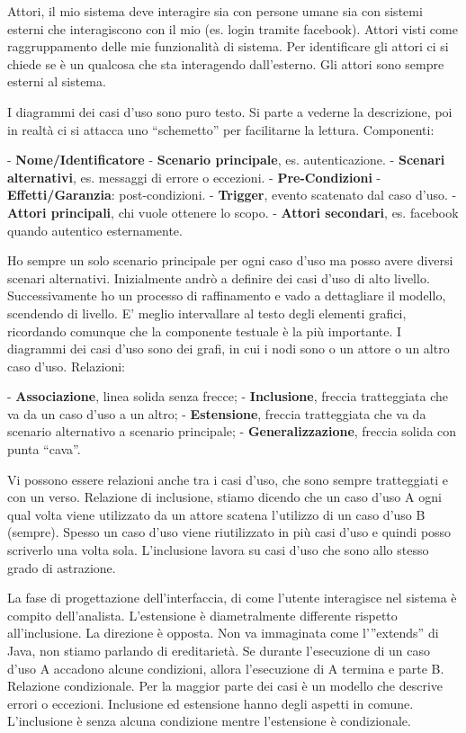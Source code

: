Attori, il mio sistema deve interagire sia con persone umane sia con sistemi esterni che interagiscono con il mio (es. login tramite facebook). Attori visti come raggruppamento delle mie funzionalità di sistema. Per identificare gli attori ci si chiede se è un qualcosa che sta interagendo dall'esterno. Gli attori sono sempre esterni al sistema.

I diagrammi dei casi d'uso sono puro testo. Si parte a vederne la descrizione, poi in realtà ci si attacca uno “schemetto” per facilitarne la lettura. Componenti:

- \textbf{Nome/Identificatore}
- \textbf{Scenario principale}, es. autenticazione.
- \textbf{Scenari alternativi}, es. messaggi di errore o eccezioni.
- \textbf{Pre-Condizioni}
- \textbf{Effetti/Garanzia}: post-condizioni.
- \textbf{Trigger}, evento scatenato dal caso d'uso.
- \textbf{Attori principali}, chi vuole ottenere lo scopo.
- \textbf{Attori secondari}, es. facebook quando autentico esternamente.

Ho sempre un solo scenario principale per ogni caso d'uso ma posso avere diversi scenari alternativi. Inizialmente andrò a definire dei casi d'uso di alto livello. Successivamente ho un processo di raffinamento e vado a dettagliare il modello, scendendo di livello. E' meglio intervallare al testo degli elementi grafici, ricordando comunque che la componente testuale è la più importante. I diagrammi dei casi d'uso sono dei grafi, in cui i nodi sono o un attore o un altro caso d'uso.
Relazioni:

- \textbf{Associazione}, linea solida senza frecce;
- \textbf{Inclusione}, freccia tratteggiata che va da un caso d'uso a un altro;
- \textbf{Estensione}, freccia tratteggiata che va da scenario alternativo a scenario principale;
- \textbf{Generalizzazione}, freccia solida con punta “cava”.

Vi possono essere relazioni anche tra i casi d'uso, che sono sempre tratteggiati e con un verso. Relazione di inclusione, stiamo dicendo che un caso d'uso A ogni qual volta viene utilizzato da un attore scatena l'utilizzo di un caso d'uso B (sempre). Spesso un caso d'uso viene riutilizzato in più casi d'uso e quindi posso scriverlo una volta sola. L'inclusione lavora su casi d'uso che sono allo stesso grado di astrazione.
 
La fase di progettazione dell'interfaccia, di come l'utente interagisce nel sistema è compito dell'analista. L'estensione è diametralmente differente rispetto all'inclusione. La direzione è opposta. Non va immaginata come l'”extends” di Java, non stiamo parlando di ereditarietà. Se durante l'esecuzione di un caso d'uso A accadono alcune condizioni, allora l'esecuzione di A termina e parte B. Relazione condizionale. Per la maggior parte dei casi è un modello che descrive errori o eccezioni.
Inclusione ed estensione hanno degli aspetti in comune. L'inclusione è senza alcuna condizione mentre l'estensione è condizionale.

